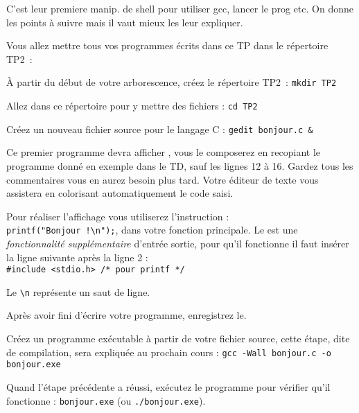 
\renewcommand{\labelitemi}{$\bullet$}

\newcommand{\commentaire}[1]{}


\vspace{-1em}
\begin{correction}
  C'est leur premiere manip. de shell pour utiliser gcc, lancer le
  prog etc. On donne les points à suivre mais il vaut mieux les leur
  expliquer.
\end{correction}

Vous allez mettre tous vos programmes écrits dans ce TP dans le
répertoire TP2~: 

\begin{newenu}
\item À partir du début de votre arborescence, créez le répertoire
  TP2~: \verb|mkdir TP2|  
\item Allez dans ce répertoire pour y mettre des fichiers : 
  \verb|cd TP2| 
\item Créez un nouveau fichier source pour le langage C : 
  \verb|gedit bonjour.c &|
\end{newenu}


Ce premier programme devra afficher , vous le composerez en recopiant le programme donné en exemple dans le TD, sauf les lignes 12 à 16. Gardez tous les commentaires vous en aurez besoin plus tard. Votre éditeur de texte vous assistera en colorisant automatiquement le code saisi. 

Pour réaliser l'affichage vous utiliserez l'instruction :\\
\verb+printf("Bonjour !\n");+, dans votre fonction principale. Le  est une \emph{fonctionnalité supplémentaire} d'entrée sortie, pour qu'il fonctionne il faut  insérer la ligne suivante après la ligne 2 : \\
\verb+#include <stdio.h> /* pour printf */+

Le \verb+\n+ représente un saut de ligne. 

\begin{lastenu}
\item Après avoir fini d'écrire votre programme, enregistrez le.
\item Créez un programme exécutable à partir de votre fichier source, cette étape, dite de compilation, sera expliquée au prochain cours :
  \verb|gcc -Wall bonjour.c -o bonjour.exe|
\item Quand l'étape précédente a réussi, exécutez le programme pour
  vérifier qu'il fonctionne : \verb|bonjour.exe| (ou
  \verb|./bonjour.exe|).
\end{lastenu}

